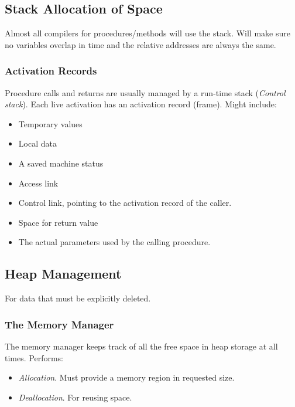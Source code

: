 \documentclass{article}
\begin{document}
\subsection{Stack Allocation of Space} %
\label{sub:Stack Allocation of Space}
Almost all compilers for procedures/methods will use the stack. Will make sure no variables overlap in time and the relative addresses are always the same.

\subsubsection{Activation Records} %
\label{ssub:Activation Records}
Procedure calls and returns are usually managed by a run-time stack (\emph{Control stack}). Each live activation has an activation record (frame). Might include:
\begin{itemize}
	\item Temporary values
	\item Local data
	\item A saved machine status
	\item Access link
	\item Control link, pointing to the activation record of the caller.
	\item Space for return value
	\item The actual parameters used by the calling procedure.
\end{itemize}

\subsection{Heap Management} %
\label{sub:Heap Management}
For data that must be explicitly deleted.
\subsubsection{The Memory Manager} %
\label{ssub:The Memory Manager}
The memory manager keeps track of all the free space in heap storage at all times. Performs:
\begin{itemize}
	\item \emph{Allocation}. Must provide a memory region in requested size.
	\item \emph{Deallocation}. For reusing space.
\end{itemize}
\end{document}
